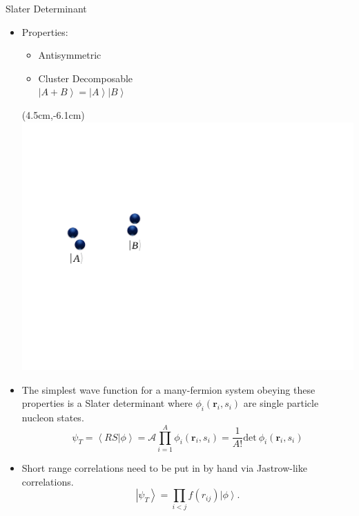 \documentclass{beamer}
\newcommand{\ket}[1]{\left| #1 \right>}
\newcommand{\braket}[2]{\left< #1 | #2 \right>}
\begin{document}
\begin{frame}{Slater Determinant}
\begin{itemize}
   \item Properties:
   \begin{itemize}
      \item Antisymmetric
      \item Cluster Decomposable \\ $\ket{A+B} = \ket{A}\ket{B}$
   \end{itemize}
   \begin{textblock*}{\textwidth}(4.5cm,-6.1cm) %
      \includegraphics[width=14.6cm]{cluster.pdf}
   \end{textblock*}
   \item The simplest wave function for a many-fermion system obeying these properties is a Slater determinant where $\phi_i(\mathbf{r}_i,s_i)$ are single particle nucleon states.
   \begin{equation*}
      \psi_{T} = \braket{RS}{\phi}= \mathcal{A} \prod\limits_{i=1}^A \phi_i(\mathbf{r}_i,s_i) = \frac{1}{A!} \mathrm{det}~\phi_i(\mathbf{r}_i,s_i)
   \end{equation*}
   \item Short range correlations need to be put in by hand via Jastrow-like correlations.
   \begin{equation*}
      \ket{\psi_T} = \prod\limits_{i<j}f(r_{ij}) \ket{\phi}.
   \end{equation*}
\end{itemize}
\end{frame}
\end{document}
